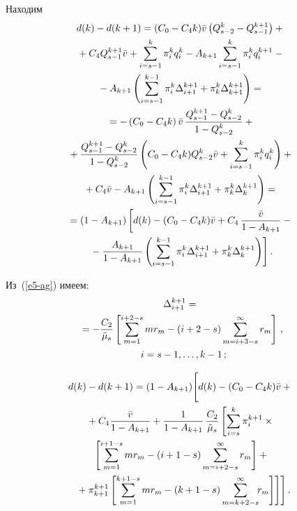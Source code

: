 \begin{multicols}{2}
Находим
\begin{multline}
d(k) - d(k+1) = (C_0 - C_4 k) \bar{v} \left(Q^k_{s-2} -
Q^{k+1}_{s-1}\right) +{}\\
{}+ C_4 Q^{k+1}_{s-1} \bar{v} +
 \sum\limits^k_{i=s-1} \pi^k_i q^k_i -
A_{k+1} \sum\limits^k_{i=s-1} \pi^k_i q^{k+1}_i -{}\\
{}-A_{k+1} \left(\sum\limits^{k-1}_{i=s-1} \pi^k_i \Delta^{k+1}_{i+1}+
\pi^k_k \Delta^{k+1}_{k+1}\right) ={}\\
{}= - \left(C_0 - C_4 k\right) \bar{v} \, \displaystyle\frac{\displaystyle Q^{k+1}_{s-1} -
Q^k_{s-2}\mathstrut}{\displaystyle 1-Q^k_{s-2}\mathstrut} +{}\\
{}+ \displaystyle\frac{\displaystyle Q^{k+1}_{s-1} - Q^k_{s-2}\mathstrut}{\displaystyle 1 - Q^k_{s-2}\mathstrut}
\left( C_0 -C_4k) Q^k_{s-2} \bar{v} +\sum\limits^k_{i=s-1}
\pi^k_i q^k_i\right) +{}\\
{}+ C_4 \bar{v} -A_{k+1} \left(\sum\limits^{k-1}_{i=s-1} \pi^k_i
\Delta^{k+1}_{i+1} + \pi^k_k \Delta^{k+1}_k\right) ={}\\
{}= ( 1 - A_{k+1}) \left[ d(k) - (C_0 - C_4 k) \bar{v} +
 C_4\, \displaystyle\frac{\displaystyle \bar{v}\mathstrut}{\displaystyle 1 - A_{k+1 }\mathstrut} -{}\right.\\
\left.{}-\displaystyle\frac{\displaystyle A_{k+1}\mathstrut}{\displaystyle 1 - A_{k+1}\mathstrut} \left(\sum\limits^{k-1}_{i=s-1} \pi^k_i
\Delta^{k+1}_{i+1} +
\pi^k_k \Delta^{k+1}_k\right)\right].
\label{e7-ag}
\end{multline}

Из~(\ref{e5-ag}) имеем:
\begin{multline}
\Delta_{i+1}^{k+1} ={}\\
{}=-\displaystyle\frac{\displaystyle C_2\mathstrut}{\displaystyle \tilde{\mu}_s\mathstrut} \left[
\sum\limits_{m=1}^{i+2-s} mr_m -(i+2-s)\sum\limits^\infty_{m=i+3-s}
r_m\right]\,,\\ 
\enskip i=s-1, \ldots , k-1\,;
\label{e8-ag}
\end{multline}

\vspace*{-12pt}

\noindent
\begin{multline*}
d(k) - d(k+1) = (1 - A_{k+1}) \!\left[ \vphantom{\sum\limits^k_{i=0}}
d(k) - ( C_0 -C_4 k) \bar{v} + {}\right.\\
{}+ C_4 \fr{\bar{v}}{1 - A_{k+1}} + 
 \fr{1}{1 - A_{k+1}}\,\fr{C_2}{\tilde{\mu}_s }
\left[  \sum\limits^k_{i=s} \pi^{k+1}_i \times{}\right.\\
{}\left[\sum\limits_{m=1}^{i+1-s} mr_m - (i+1-s) \sum\limits_{m=i+2-s}^{\infty}
r_m\right] +{}\\
\left.\left.{}+ \pi^{k+1}_{k+1} \left[\sum\limits_{m=1}^{k+1-s}  mr_m
- (k +1 -s) \sum\limits_{m=k+2-s}^{\infty}\!\! r_m\right]\right]\right].\hspace*{-2.35pt}
\end{multline*}


\end{multicols}
